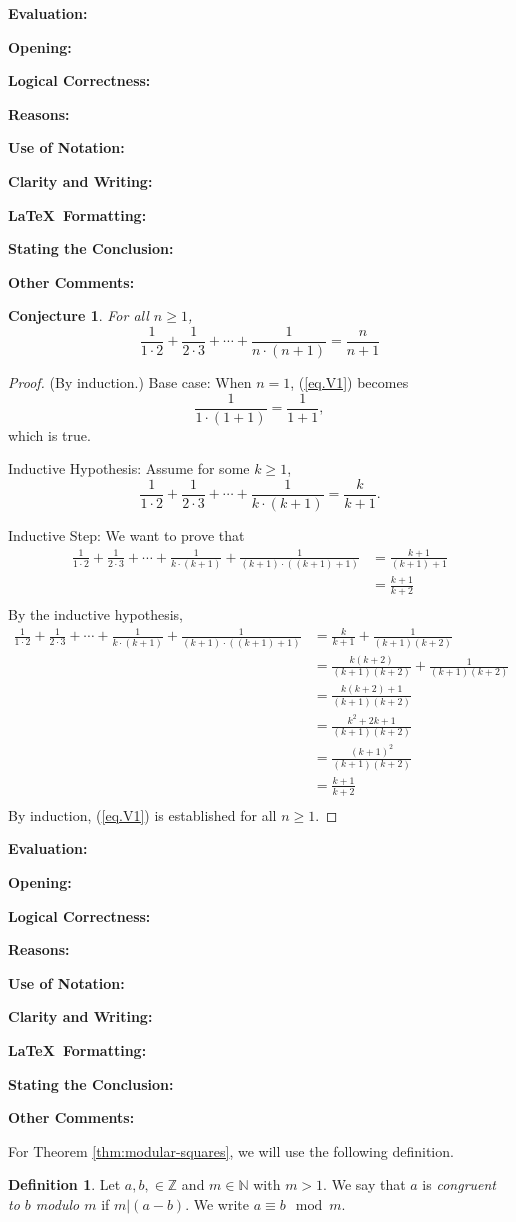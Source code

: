 \documentclass[11pt,titlepage]{article}		%
\def\rubric{\textbf{Evaluation:} \makebox[0.75in]{\hrulefill}

\vspace{.3in}

\textbf{Opening:} \makebox[0.75in]{\hrulefill}

\vspace{.3in}

\textbf{Logical Correctness:} \makebox[0.75in]{\hrulefill}

\vspace{.3in}

\textbf{Reasons:} \makebox[0.75in]{\hrulefill}

\vspace{.3in}

\textbf{Use of Notation:} \makebox[0.75in]{\hrulefill}

\vspace{.3in}

\textbf{Clarity and Writing:} \makebox[0.75in]{\hrulefill}

\vspace{.3in}

\textbf{\LaTeX\ Formatting:} \makebox[0.75in]{\hrulefill}

\vspace{.3in}

\textbf{Stating the Conclusion:} \makebox[0.75in]{\hrulefill}

\vspace{.3in}

\textbf{Other Comments:}

\vspace{1in}

}
\def\Z{{\mathbb Z}}
\def\N{{\mathbb N}}
\newtheorem{conjecture}[theorem]{Conjecture}
\theoremstyle{definition}
\newtheorem{definition}{Definition}
\theoremstyle{theorem}
\begin{document}
\rubric


\clearpage


\begin{conjecture}
    For all $n\ge 1$,
    \begin{equation} \label{eq.V1}
        \frac{1}{1\cdot 2} + \frac{1}{2\cdot 3} + \cdots + \frac{1}{n\cdot(n+1)} = \frac{n}{n+1}
    \end{equation}
\end{conjecture}

\begin{proof}
(By induction.)
Base case: When $n=1$, (\ref{eq.V1}) becomes
\[
    \frac{1}{1\cdot(1+1)} = \frac{1}{1+1},
\]
which is true.

Inductive Hypothesis: Assume for some $k\ge 1$,
\[
     \frac{1}{1\cdot 2} + \frac{1}{2\cdot 3} + \cdots + \frac{1}{k\cdot(k+1)} = \frac{k}{k+1}.
\]

Inductive Step: We want to prove that
\begin{align*}
     \frac{1}{1\cdot 2} + \frac{1}{2\cdot 3} + \cdots + \frac{1}{k\cdot(k+1)} + \frac{1}{(k+1)\cdot((k+1)+1)} & = \frac{k+1}{(k+1)+1}\\
     & = \frac{k+1}{k+2}\\
\end{align*}
By the inductive hypothesis,
\begin{align*}
    \frac{1}{1\cdot 2} + \frac{1}{2\cdot 3} + \cdots + \frac{1}{k\cdot(k+1)} + \frac{1}{(k+1)\cdot((k+1)+1)} &= \frac{k}{k+1}+\frac{1}{(k+1)(k+2)}\\
    & =\frac{k(k+2)}{(k+1)(k+2)}+\frac{1}{(k+1)(k+2)}\\
    & =\frac{k(k+2)+1}{(k+1)(k+2)}\\
    & =\frac{k^2+2k+1}{(k+1)(k+2)}\\
    & =\frac{(k+1)^2}{(k+1)(k+2)}\\
    & =\frac{k+1}{k+2}\\
\end{align*}
By induction, (\ref{eq.V1}) is established for all $n\ge 1$.

\end{proof}

\rubric



\clearpage

For Theorem \ref{thm:modular-squares}, we will use the following definition.

\begin{definition}
    Let $a,b,\in\Z$ and $m\in \N$ with $m > 1$.
    We say that $a$ is \emph{congruent to $b$ modulo $m$} if $m|(a-b)$.
    We write $a \equiv b\mod m$.
\end{definition}
\end{document}

